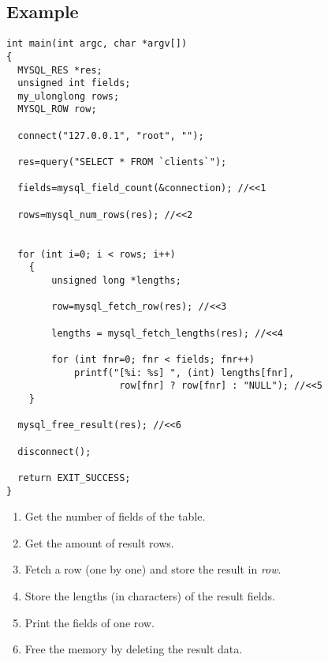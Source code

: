 \subsection{Example}
\begin{verbatim}
int main(int argc, char *argv[])
{
  MYSQL_RES *res;
  unsigned int fields;
  my_ulonglong rows;
  MYSQL_ROW row;

  connect("127.0.0.1", "root", "");

  res=query("SELECT * FROM `clients`");

  fields=mysql_field_count(&connection); //<<1

  rows=mysql_num_rows(res); //<<2


  for (int i=0; i < rows; i++)
    {
        unsigned long *lengths;

        row=mysql_fetch_row(res); //<<3

        lengths = mysql_fetch_lengths(res); //<<4

        for (int fnr=0; fnr < fields; fnr++)
            printf("[%i: %s] ", (int) lengths[fnr],
                    row[fnr] ? row[fnr] : "NULL"); //<<5
    }

  mysql_free_result(res); //<<6

  disconnect();

  return EXIT_SUCCESS;
}
\end{verbatim}
\begin{enumerate}
\item Get the number of fields of the table.
\item Get the amount of result rows.
\item Fetch a row (one by one) and store the result in \textit{row}.
\item Store the lengths (in characters) of the result fields.
\item Print the fields of one row.
\item Free the memory by deleting the result data.
\end{enumerate}


